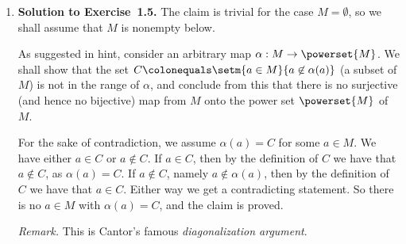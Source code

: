 \begin{enumerate}[1.]
%
\item \textbf{Solution to Exercise~1.5.} The claim is trivial for the case $M = \emptyset$, so we shall assume that $M$ is nonempty below.\par
As suggested in hint, consider an arbitrary map $\alpha: M \to \powerset{M}$. We shall show that the set $C \colonequals \setm{a \in M}{a \not\in \alpha(a)}$ (a subset of $M$) is not in the range of $\alpha$, and conclude from this that there is no surjective (and hence no bijective) map from $M$ onto the power set $\powerset{M}$ of $M$.\par
For the sake of contradiction, we assume $\alpha(a) = C$ for some $a \in M$. We have either $a \in C$ or $a \not\in C$. If $a \in C$, then by the definition of $C$ we have that $a \not\in C$, as $\alpha(a) = C$. If $a \not\in C$, namely $a \not\in \alpha(a)$, then by the definition of $C$ we have that $a \in C$. Either way we get a contradicting statement. So there is no $a \in M$ with $\alpha(a) = C$, and the claim is proved.\par
\textit{Remark.} This is Cantor's famous \emph{diagonalization argument}.
%
\end{enumerate}
%
